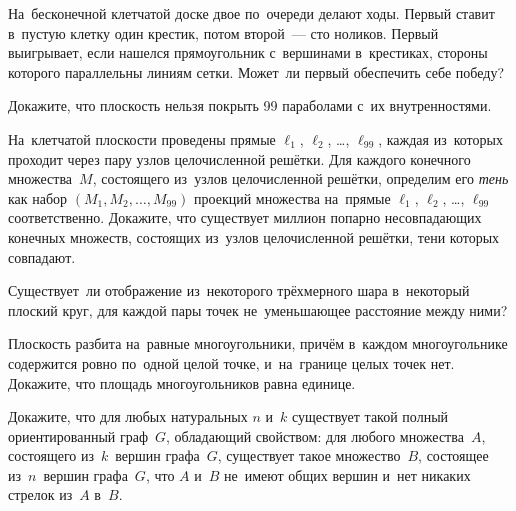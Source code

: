 


\begin{problems}

\item
На~бесконечной клетчатой доске двое по~очереди делают ходы.
Первый ставит в~пустую клетку один крестик, потом второй~--- сто ноликов.
Первый выигрывает, если нашелся прямоугольник с~вершинами в~крестиках, стороны
которого параллельны линиям сетки.
Может~ли первый обеспечить себе победу?

\item
Докажите, что плоскость нельзя покрыть 99 параболами с~их внутренностями.

\item
На~клетчатой плоскости проведены прямые
$\ell_{1}$, $\ell_{2}$, \ldots, $\ell_{99}$,
каждая из~которых проходит через пару узлов целочисленной решётки.
Для каждого конечного множества~$M$, состоящего из~узлов целочисленной решётки,
определим его \emph{тень} как набор $( M_{1}, M_{2}, \ldots, M_{99} )$ проекций
множества на~прямые $\ell_{1}$, $\ell_{2}$, \ldots, $\ell_{99}$ соответственно.
Докажите, что существует миллион попарно несовпадающих конечных множеств,
состоящих из~узлов целочисленной решётки, тени которых совпадают.


\item
Существует~ли отображение из~некоторого трёхмерного шара в~некоторый плоский
круг, для каждой пары точек не~уменьшающее расстояние между ними?

\item
Плоскость разбита на~равные многоугольники, причём в~каждом многоугольнике
содержится ровно по~одной целой точке, и~на~границе целых точек нет.
Докажите, что площадь многоугольников равна единице.

\item
Докажите, что для любых натуральных $n$ и~$k$ существует такой полный
ориентированный граф~$G$, обладающий свойством: для любого множества~$A$,
состоящего из~$k$~вершин графа~$G$, существует такое множество~$B$, состоящее
из~$n$~вершин графа~$G$, что $A$ и~$B$ не~имеют общих вершин и~нет никаких
стрелок из~$A$ в~$B$.


\end{problems}
